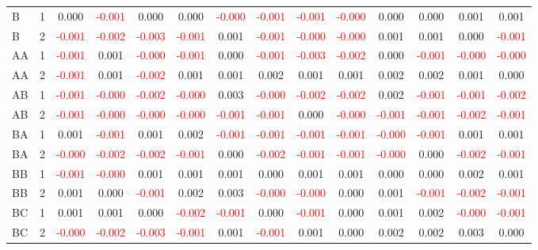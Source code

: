 \begin{table}[!htb]
{\begin{tabular}{llcccccccccccc}
B & 1 & 0.000 & \textcolor{red}{-0.001} & 0.000 & 0.000 & \textcolor{red}{-0.000} & \textcolor{red}{-0.001} & \textcolor{red}{-0.001} & \textcolor{red}{-0.000} & 0.000 & 0.000 & 0.001 & 0.001\\
B & 2 & \textcolor{red}{-0.001} & \textcolor{red}{-0.002} & \textcolor{red}{-0.003} & \textcolor{red}{-0.001} & 0.001 & \textcolor{red}{-0.001} & \textcolor{red}{-0.000} & \textcolor{red}{-0.000} & 0.001 & 0.001 & 0.000 & \textcolor{red}{-0.001}\\
AA & 1 & \textcolor{red}{-0.001} & 0.001 & \textcolor{red}{-0.000} & \textcolor{red}{-0.001} & 0.000 & \textcolor{red}{-0.001} & \textcolor{red}{-0.003} & \textcolor{red}{-0.002} & 0.000 & \textcolor{red}{-0.001} & \textcolor{red}{-0.000} & \textcolor{red}{-0.000}\\
AA & 2 & \textcolor{red}{-0.001} & 0.001 & \textcolor{red}{-0.002} & 0.001 & 0.001 & 0.002 & 0.001 & 0.001 & 0.002 & 0.002 & 0.001 & 0.000\\
AB & 1 & \textcolor{red}{-0.001} & \textcolor{red}{-0.000} & \textcolor{red}{-0.002} & \textcolor{red}{-0.000} & 0.003 & \textcolor{red}{-0.000} & \textcolor{red}{-0.002} & \textcolor{red}{-0.002} & 0.002 & \textcolor{red}{-0.001} & \textcolor{red}{-0.001} & \textcolor{red}{-0.002}\\
AB & 2 & \textcolor{red}{-0.001} & \textcolor{red}{-0.000} & \textcolor{red}{-0.000} & \textcolor{red}{-0.000} & \textcolor{red}{-0.001} & \textcolor{red}{-0.001} & 0.000 & \textcolor{red}{-0.000} & \textcolor{red}{-0.001} & \textcolor{red}{-0.001} & \textcolor{red}{-0.002} & \textcolor{red}{-0.001}\\
BA & 1 & 0.001 & \textcolor{red}{-0.001} & 0.001 & 0.002 & \textcolor{red}{-0.001} & \textcolor{red}{-0.001} & \textcolor{red}{-0.001} & \textcolor{red}{-0.001} & \textcolor{red}{-0.000} & \textcolor{red}{-0.001} & 0.001 & 0.001\\
BA & 2 & \textcolor{red}{-0.000} & \textcolor{red}{-0.002} & \textcolor{red}{-0.002} & \textcolor{red}{-0.001} & 0.000 & \textcolor{red}{-0.002} & \textcolor{red}{-0.001} & \textcolor{red}{-0.001} & \textcolor{red}{-0.000} & 0.000 & \textcolor{red}{-0.002} & \textcolor{red}{-0.001}\\
BB & 1 & \textcolor{red}{-0.001} & \textcolor{red}{-0.000} & 0.001 & 0.001 & 0.001 & 0.000 & 0.001 & 0.001 & 0.000 & 0.000 & 0.002 & 0.001\\
BB & 2 & 0.001 & 0.000 & \textcolor{red}{-0.001} & 0.002 & 0.003 & \textcolor{red}{-0.000} & \textcolor{red}{-0.000} & 0.000 & 0.001 & \textcolor{red}{-0.001} & \textcolor{red}{-0.002} & \textcolor{red}{-0.001}\\
BC & 1 & 0.001 & 0.001 & 0.000 & \textcolor{red}{-0.002} & \textcolor{red}{-0.001} & 0.000 & \textcolor{red}{-0.001} & 0.000 & 0.001 & 0.002 & \textcolor{red}{-0.000} & \textcolor{red}{-0.001}\\
BC & 2 & \textcolor{red}{-0.000} & \textcolor{red}{-0.002} & \textcolor{red}{-0.003} & \textcolor{red}{-0.001} & 0.001 & \textcolor{red}{-0.001} & 0.001 & 0.000 & 0.002 & 0.002 & 0.003 & 0.000\\
\hline
    \end{tabular}%
    }
\end{table}

